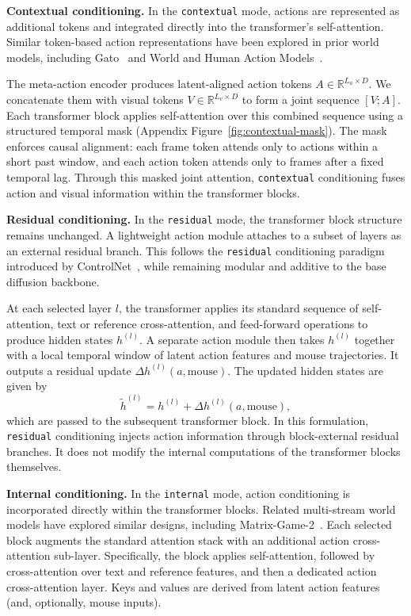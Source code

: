 \noindent\textbf{Contextual conditioning.}
In the \texttt{contextual} mode, actions are represented as additional tokens and integrated directly into the transformer’s self-attention.
Similar token-based action representations have been explored in prior world models, including Gato~\citep{reed2022generalist} and World and Human Action Models~\citep{kanervisto2025world}.

The meta-action encoder produces latent-aligned action tokens $A \in \mathbb{R}^{L_a \times D}$.
We concatenate them with visual tokens $V \in \mathbb{R}^{L_v \times D}$ to form a joint sequence $[V; A]$.
Each transformer block applies self-attention over this combined sequence using a structured temporal mask (Appendix Figure~\ref{fig:contextual-mask}).
The mask enforces causal alignment: each frame token attends only to actions within a short past window, and each action token attends only to frames after a fixed temporal lag.
Through this masked joint attention, \texttt{contextual} conditioning fuses action and visual information within the transformer blocks.


\noindent\textbf{Residual conditioning.}
In the \texttt{residual} mode, the transformer block structure remains unchanged.
A lightweight action module attaches to a subset of layers as an external residual branch.
This follows the \texttt{residual} conditioning paradigm introduced by ControlNet~\citep{zhang2023adding}, while remaining modular and additive to the base diffusion backbone.

At each selected layer $l$, the transformer applies its standard sequence of self-attention, text or reference cross-attention, and feed-forward operations to produce hidden states $h^{(l)}$.
A separate action module then takes $h^{(l)}$ together with a local temporal window of latent action features and mouse trajectories.
It outputs a residual update $\Delta h^{(l)}(a,\text{mouse})$.
The updated hidden states are given by
\[
  \tilde{h}^{(l)} = h^{(l)} + \Delta h^{(l)}(a,\text{mouse}),
\]
which are passed to the subsequent transformer block.
In this formulation, \texttt{residual} conditioning injects action information through block-external residual branches.
It does not modify the internal computations of the transformer blocks themselves.


\noindent\textbf{Internal conditioning.}
In the \texttt{internal} mode, action conditioning is incorporated directly within the transformer blocks.
Related multi-stream world models have explored similar designs, including Matrix-Game-2~\citep{he2025matrix}.
Each selected block augments the standard attention stack with an additional action cross-attention sub-layer.
Specifically, the block applies self-attention, followed by cross-attention over text and reference features, and then a dedicated action cross-attention layer.
Keys and values are derived from latent action features (and, optionally, mouse inputs).

